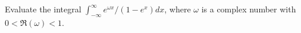 Evaluate the integral $\int_{-\infty}^{\infty}e^{\omega x}/(1-e^x)dx$,
where $\omega$ is a complex number with $0<\Re(\omega)<1$.
